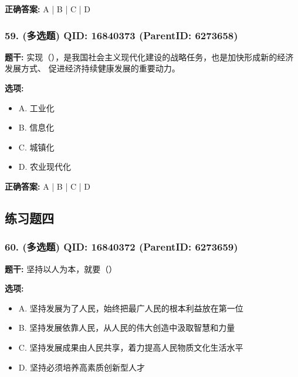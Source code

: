 \documentclass[12pt,UTF8]{ctexart}
\begin{document}
\textbf{正确答案:}
A | B | C | D

\vspace{0.3em}\hrulefill\vspace{0.7em}

\subsubsection*{59. (多选题) \small QID: 16840373 (ParentID: 6273658)}

\textbf{题干:}
实现（），是我国社会主义现代化建设的战略任务，也是加快形成新的经济发展方式、 促进经济持续健康发展的重要动力。



\textbf{选项:}
\begin{itemize}[leftmargin=*]

  \item A. 工业化

  \item B. 信息化

  \item C. 城镇化

  \item D. 农业现代化

\end{itemize}

\textbf{正确答案:}
A | B | C | D

\vspace{0.3em}\hrulefill\vspace{0.7em}

\subsection*{练习题四}

\subsubsection*{60. (多选题) \small QID: 16840372 (ParentID: 6273659)}

\textbf{题干:}
坚持以人为本，就要（）



\textbf{选项:}
\begin{itemize}[leftmargin=*]

  \item A. 坚持发展为了人民，始终把最广人民的根本利益放在第一位

  \item B. 坚持发展依靠人民，从人民的伟大创造中汲取智慧和力量

  \item C. 坚持发展成果由人民共享，着力提高人民物质文化生活水平

  \item D. 坚持必须培养高素质创新型人才

\end{itemize}
\end{document}
